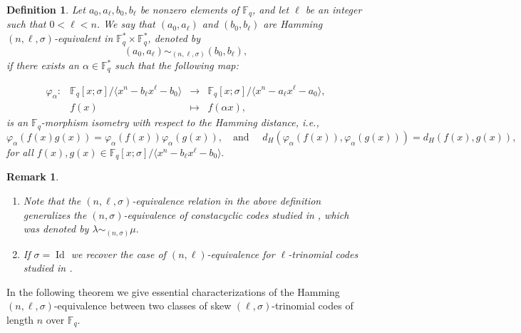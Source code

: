\documentclass[12pt,paper]{article}
\theoremstyle{plain}
\newtheorem{definition}[theorem]{Definition}
\newtheorem{remark}[theorem]{Remark}
\newcommand{\Fq}{\mathbb{F}_{q}}
\DeclareMathOperator{\id}{Id}
\begin{document}
 \begin{definition}\label{Def_Iso}
Let $a_0, a_{\ell}, b_0, b_{\ell}$ be nonzero elements of $\mathbb{F}_q$, and let $\ell$ be an integer such that $0 < \ell < n$. We say that $(a_0, a_{\ell})$ and $(b_0, b_{\ell})$ are { Hamming $(n,\ell,\sigma)$-equivalent} 
in $\mathbb{F}_q^* \times \mathbb{F}_q^*$, denoted by 
$$
(a_0, a_{\ell}) \sim_{(n,\ell,\sigma)} (b_0, b_{\ell}),
$$
if there exists an $\alpha \in \mathbb{F}_q^*$ such that the following map:

  \begin{equation}
  	\begin{array}{cccc}
  	\varphi_{\alpha}:& \mathbb{F}_q[x;\sigma] /\langle x^n-b_{\ell}x^{\ell}-b_0 \rangle  &\longrightarrow & \mathbb{F}_q[x;\sigma] /\langle x^n-a_{\ell}x^{\ell}-a_0 \rangle, \\ 
  	& f(x) & \longmapsto &  f(\alpha x),
  	\end{array}
  	\end{equation} 
is an  $\mathbb{F}_q$-morphism isometry with respect to the Hamming distance,  i.e., 
$$\varphi_{\alpha}( f(x) g(x))= \varphi_{\alpha}( f(x)) \varphi_{\alpha}( g(x)), \quad \text{and } \quad d_H(\varphi_{\alpha}(f(x)), \varphi_{\alpha}(g(x)))=d_H(f(x), g(x)), $$ 
for all $ f(x), g(x) \in \Fq[x;\sigma] /\langle x^n-b_{\ell}x^{\ell}-b_0 \rangle.$
\end{definition}






\begin{remark}\label{Remark.3}
\begin{enumerate}
 \item  Note that the $(n,\ell,\sigma)$-equivalence relation in the above definition generalizes the $(n,\sigma)$-equivalence of constacyclic codes studied in \cite[Section 4]{Ouazzou2025}, which was denoted by $ \lambda \sim_{(n,\sigma)} \mu .$
 \item  If $\sigma=\id$ we recover  the case of $(n,\ell)$-equivalence for  $\ell$-trinomial   codes studied in \cite{Equiv2025}.

\end{enumerate}
\end{remark}


In the following theorem we give essential characterizations of  the Hamming $(n,\ell,\sigma)$-equivalence   between two classes of skew $(\ell,\sigma)$-trinomial codes of length $n$ over $\mathbb{F}_q$. 
\end{document}
